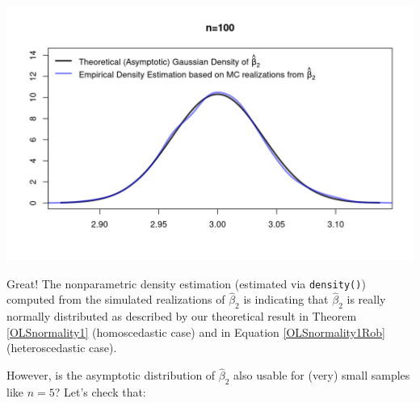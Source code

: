 \documentclass[
  14pt,
]{memoir}
\begin{document}
\begin{center}\includegraphics[width=1\textwidth]{figure/minimal-unnamed-chunk-82-1} \end{center}

Great! The nonparametric density estimation (estimated via \texttt{density()}) computed from the simulated realizations of \(\hat\beta_2\) is indicating that \(\hat\beta_2\) is really normally distributed as described by our theoretical result in Theorem \ref{OLSnormality1} (homoscedastic case) and in Equation \eqref{OLSnormality1Rob} (heteroscedastic case).

However, is the asymptotic distribution of \(\hat\beta_2\) also usable for (very) small samples like \(n=5\)? Let's check that:
\end{document}
